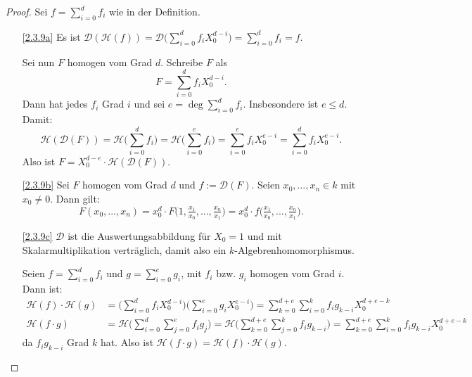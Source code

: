 \documentclass[a4paper,12pt,index=toc]{scrbook}
\theoremstyle{keinenummern} %
\newcommand{\DD}{\mathcal{D}} %
\renewcommand{\H}{\mathcal{H}} %
\renewcommand{\dotsc}{\ensuremath{\!...}}
\begin{document}
\begin{proof} Sei $\displaystyle f=\sum_{i=0}^{d}f_{i}$ wie in der Definition.
\begin{enumerate}\vspace*{-6pt}
\item[\ref{2.3.9a}] Es ist $\displaystyle \DD(\H(f))=\DD\biggl(\sum_{i=0}^{d}f_{i}X_{0}^{d-i}\biggr)=\sum_{i=0}^{d}f_{i}=f$. 

Sei nun $F$ homogen vom Grad $d$. Schreibe $F$ als 
\begin{equation*}F=\sum_{i=0}^{d}f_{i}X_{0}^{d-i}.\end{equation*}\vspace*{-6pt}
Dann hat jedes $f_{i}$ Grad $i$ und sei $\displaystyle e=\deg\sum_{i=0}^{d}f_{i}$. Insbesondere ist $e\leq d$. Damit:
\begin{equation*}\H(\DD(F))=\H\biggl(\sum_{i=0}^{d}f_{i}\biggr)=\H\biggl(\sum_{i=0}^{e}f_{i}\biggr)=\sum_{i=0}^{e}f_{i}X_{0}^{e-i}=\sum_{i=0}^{d}f_{i}X_{0}^{e-i}.\end{equation*}
Also ist $F=X_{0}^{d-e}\cdot \H(\DD(F))$.
\item[\ref{2.3.9b}] Sei $F$ homogen vom Grad $d$ und $f:=\DD(F)$. Seien $x_{0},\dotsc,x_{n}\in k$ mit $x_{0}\neq 0$. Dann gilt:\vspace*{-6pt}
\begin{equation*}F(x_{0},\dotsc,x_{n})=x_{0}^{d}\cdot F\bigl(1,\tfrac{x_{1}}{x_{0}},\dotsc,\tfrac{x_{n}}{x_{1}}\bigr)=x_{0}^{d}\cdot f\bigl(\tfrac{x_{1}}{x_{0}},\dotsc,\tfrac{x_{n}}{x_{1}}\bigr).\end{equation*}
\item[\ref{2.3.9c}] $\DD$ ist die Auswertungsabbildung für $X_{0}=1$ und mit Skalarmultiplikation verträglich, damit also ein $k$-Algebrenhomomorphismus.

Seien $\displaystyle f=\sum_{i=0}^{d}f_{i}$ und $\displaystyle g=\sum_{i=0}^{e}g_{i}$, mit $f_{i}$ bzw. $g_{i}$ homogen vom Grad $i$. Dann ist:\vspace*{-12pt}
\begin{align*}
\H(f)\cdot \H(g)&=\biggl(\sum_{i=0}^{d}f_{i}X_{0}^{d-i}\biggr)\biggl(\sum_{i=0}^{e}g_{i}X_{0}^{e-i}\biggr)
=\sum_{k=0}^{d+e}\sum_{i=0}^{k}f_{i}g_{k-i}X_{0}^{d+e-k}\\
\H(f\cdot g)&=\H\biggl(\sum_{i=0}^{d}\sum_{j=0}^{e}f_{i}g_{j}\biggr)=\H\biggl(\sum_{k=0}^{d+e}\sum_{j=0}^{k}f_{i}g_{k-i}\biggr)=\sum_{k=0}^{d+e}\sum_{i=0}^{k}f_{i}g_{k-i}X_{0}^{d+e-k}\end{align*}
da $f_{i}g_{k-i}$ Grad $k$ hat. Also ist $\H(f\cdot g)=\H(f)\cdot\H(g)$.


\end{enumerate}
\end{proof}
\end{document}
